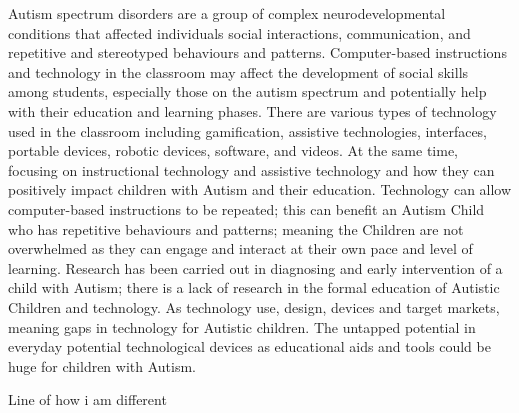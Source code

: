 Autism spectrum disorders are a group of complex neurodevelopmental conditions that affected individuals social interactions, communication, and repetitive and stereotyped behaviours and patterns. Computer-based instructions and technology in the classroom may affect the development of social skills among students, especially those on the autism spectrum and potentially help with their education and learning phases. There are various types of technology used in the classroom including gamification, assistive technologies, interfaces, portable devices, robotic devices, software, and videos. At the same time, focusing on instructional technology and assistive technology and how they can positively impact children with Autism and their education. Technology can allow computer-based instructions to be repeated; this can benefit an Autism Child who has repetitive behaviours and patterns; meaning the Children are not overwhelmed as they can engage and interact at their own pace and level of learning. Research has been carried out in diagnosing and early intervention of a child with Autism; there is a lack of research in the formal education of Autistic Children and technology. As technology use, design, devices and target markets, meaning gaps in technology for Autistic children. The untapped potential in everyday potential technological devices as educational aids and tools could be huge for children with Autism.

Line of how i am different